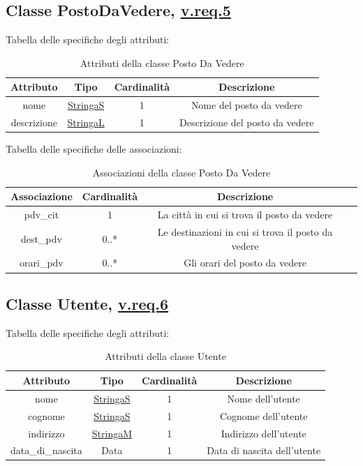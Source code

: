 \documentclass{article}
\begin{document}
\subsection*{Classe PostoDaVedere, \hyperref[sec:RequisitiPostoDaVedere]{v.req.5}}\label{sec:PostoDaVedere}

Tabella delle specifiche degli attributi:
\begin{table}[h!]
    \centering
    \begin{tabular}{|c|c|c|c|}
        \hline
        Attributo & Tipo & Cardinalità & Descrizione \\
        \hline
        nome & \hyperref[sec:StringaS]{StringaS} & 1 & Nome del posto da vedere \\
        descrizione & \hyperref[sec:StringaL]{StringaL} & 1 & Descrizione del posto da vedere \\
        \hline
    \end{tabular}
    \caption{Attributi della classe Posto Da Vedere}
\end{table}

Tabella delle specifiche delle associazioni:
\begin{table}[h!]
    \centering
    \begin{tabular}{|c|c|c|c|}
        \hline
        Associazione & Cardinalità & Descrizione \\
        \hline
        pdv\_cit & 1 & La città in cui si trova il posto da vedere \\
        dest\_pdv & 0..* & Le destinazioni in cui si trova il posto da vedere \\
        orari\_pdv & 0..* & Gli orari del posto da vedere \\
        \hline
    \end{tabular}
    \caption{Associazioni della classe Posto Da Vedere}
\end{table}

\subsection*{Classe Utente, \hyperref[sec:RequisitiUtente]{v.req.6}}\label{sec:Utente}

Tabella delle specifiche degli attributi:
\begin{table}[h!]
    \centering
    \begin{tabular}{|c|c|c|c|}
        \hline
        Attributo & Tipo & Cardinalità & Descrizione \\
        \hline
        nome & \hyperref[sec:StringaS]{StringaS} & 1 & Nome dell'utente \\
        cognome & \hyperref[sec:StringaS]{StringaS} & 1 & Cognome dell'utente \\
        indirizzo & \hyperref[sec:StringaM]{StringaM} & 1 & Indirizzo dell'utente \\
        data\_di\_nascita & Data & 1 & Data di nascita dell'utente \\
        \hline
    \end{tabular}
    \caption{Attributi della classe Utente}
\end{table}
\end{document}
